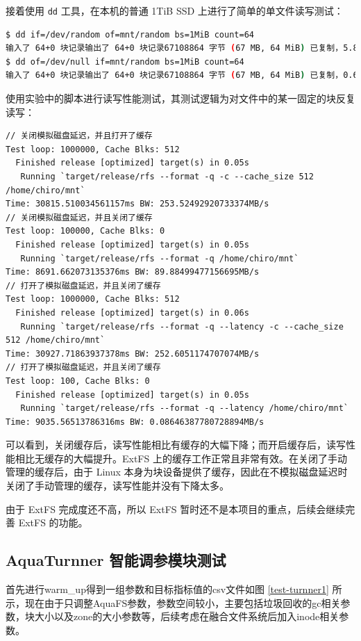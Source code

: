 接着使用 \verb|dd| 工具，在本机的普通 1TiB SSD 上进行了简单的单文件读写测试：

\begin{lstlisting}[language=bash]
$ dd if=/dev/random of=mnt/random bs=1MiB count=64
输入了 64+0 块记录输出了 64+0 块记录67108864 字节 (67 MB, 64 MiB) 已复制，5.88972 s，11.4 MB/s
$ dd of=/dev/null if=mnt/random bs=1MiB count=64
输入了 64+0 块记录输出了 64+0 块记录67108864 字节 (67 MB, 64 MiB) 已复制，0.635838 s，106 MB/s
\end{lstlisting}

使用实验中的脚本进行读写性能测试，其测试逻辑为对文件中的某一固定的块反复读写：

\begin{lstlisting}
// 关闭模拟磁盘延迟，并且打开了缓存
Test loop: 1000000, Cache Blks: 512
  Finished release [optimized] target(s) in 0.05s
   Running `target/release/rfs --format -q -c --cache_size 512 /home/chiro/mnt`
Time: 30815.510034561157ms BW: 253.52492920733374MB/s
// 关闭模拟磁盘延迟，并且关闭了缓存
Test loop: 100000, Cache Blks: 0
  Finished release [optimized] target(s) in 0.05s
   Running `target/release/rfs --format -q /home/chiro/mnt`
Time: 8691.662073135376ms BW: 89.88499477156695MB/s
// 打开了模拟磁盘延迟，并且关闭了缓存
Test loop: 1000000, Cache Blks: 512
  Finished release [optimized] target(s) in 0.06s
   Running `target/release/rfs --format -q --latency -c --cache_size 512 /home/chiro/mnt`
Time: 30927.71863937378ms BW: 252.6051174707074MB/s
// 打开了模拟磁盘延迟，并且关闭了缓存
Test loop: 100, Cache Blks: 0
  Finished release [optimized] target(s) in 0.05s
   Running `target/release/rfs --format -q --latency /home/chiro/mnt`
Time: 9035.56513786316ms BW: 0.08646387780728894MB/s
\end{lstlisting}

可以看到，关闭缓存后，读写性能相比有缓存的大幅下降；而开启缓存后，读写性能相比无缓存的大幅提升。ExtFS 上的缓存工作正常且非常有效。在关闭了手动管理的缓存后，由于 Linux 本身为块设备提供了缓存，因此在不模拟磁盘延迟时关闭了手动管理的缓存，读写性能并没有下降太多。

由于 ExtFS 完成度还不高，所以 ExtFS 暂时还不是本项目的重点，后续会继续完善 ExtFS 的功能。

\subsection{AquaTurnner 智能调参模块测试}

首先进行warm\_up得到一组参数和目标指标值的csv文件如图 \ref{test-turnner1} 所示，现在由于只调整AquaFS参数，参数空间较小，主要包括垃圾回收的gc相关参数，块大小以及zone的大小参数等，后续考虑在融合文件系统后加入inode相关参数。

